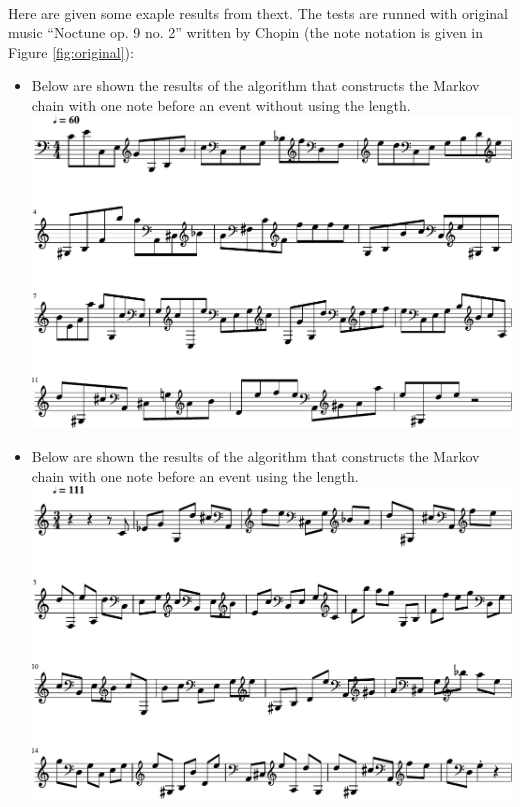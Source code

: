 \documentclass[]{article}
\begin{document}
        \paragraph{}Here are given some exaple results from thext. The tests are runned with original music ``Noctune op. 9 no. 2'' written by Chopin (the note notation is given in Figure \ref{fig:original}):
        \begin{itemize}
            \item Below are shown the results of the algorithm that constructs the Markov chain with one note before an event without using the length.\\
            \includegraphics[scale=0.6]{result_one_note}
            \item Below are shown the results of the algorithm that constructs the Markov chain with one note before an event using the length.\\
            \includegraphics[scale=0.6]{result_one_note_time}

\end{itemize}
\end{document}
